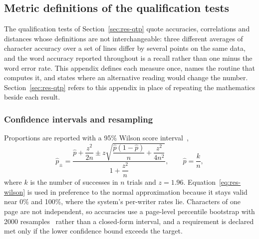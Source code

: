 
\subsection{Metric definitions of the qualification tests}
\label{sec:app-met}

The qualification tests of Section~\ref{sec:res-qtp} quote accuracies, correlations and distances whose definitions are not interchangeable: three different averages of character accuracy over a set of lines differ by several points on the same data, and the word accuracy reported throughout is a recall rather than one minus the word error rate.
This appendix defines each measure once, names the routine that computes it, and states where an alternative reading would change the number.
Section~\ref{sec:res-qtp} refers to this appendix in place of repeating the mathematics beside each result.

\subsubsection{Confidence intervals and resampling}

Proportions are reported with a 95\% Wilson score interval~\cite{wilson1927},
\begin{equation}
\label{eq:res-wilson}
\hat p_{\pm}=\frac{\hat p+\dfrac{z^2}{2n}\pm z\sqrt{\dfrac{\hat p(1-\hat p)}{n}+\dfrac{z^2}{4n^2}}}{1+\dfrac{z^2}{n}},\qquad \hat p=\frac{k}{n},
\end{equation}
where $k$ is the number of successes in $n$ trials and $z=1.96$.
Equation~\ref{eq:res-wilson} is used in preference to the normal approximation because it stays valid near 0\% and 100\%, where the system's per-writer rates lie.
Characters of one page are not independent, so accuracies use a page-level percentile bootstrap with 2000 resamples~\cite[p.~3]{efron1979} rather than a closed-form interval, and a requirement is declared met only if the lower confidence bound exceeds the target.

